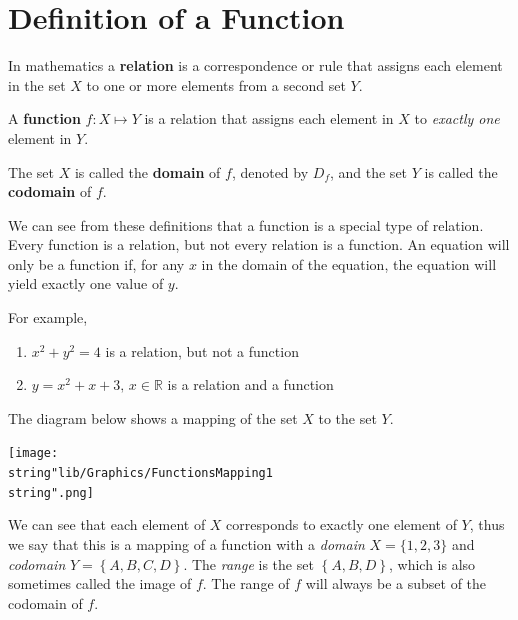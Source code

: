 \documentclass[11pt,a4paper]{book}
\newcommand{\R}{\mathbb{R}}
\begin{document}
\section{Definition of a Function}
\begin{tcolorbox}[colback=blue!5, colframe=black,boxrule=.4pt, sharpish corners]

In mathematics a \textbf{relation }is a correspondence or rule that assigns each element in the set $X$ to one or more elements from a second set $Y$.

\medskip{}

A \textbf{function} $f:X\mapsto Y$ is a relation that assigns
each element in $X$ to\textit{ exactly one} element in $Y$.

\medskip{}

The set $X$ is called the \textbf{domain} of $f$, denoted by $D_{f}$, and
the set $Y$ is called the \textbf{codomain} of $f$.

\end{tcolorbox}

We can see from these definitions that a function is a special type of relation. Every function is a relation, but not every relation is a function. An equation will only be a function if, for any $x$ in the domain of the equation, the equation will yield exactly one value of $y$.

For example,

\begin{enumerate}[label=(\alph*)]

\item $x^{2}+y^{2}=4$ is a relation, but not a function

\item $y=x^{2}+x+3,\,x\in\R$ is a relation and a function

\end{enumerate}

The diagram below shows a mapping of the set $X$ to the set $Y$.
\begin{center}
\texttt{[image: \\string"lib/Graphics/FunctionsMapping1\\string".png]}
\par\end{center}

We can see that each element of $X$ corresponds to exactly one element of $Y$, thus we say that this is a mapping of a function with a \textit{domain} $X=\{1,2,3\}$ and \textit{codomain} $Y=\left\{ A,B,C,D\right\} $. The \textit{range} is the set $\left\{ A,B,D\right\} $, which is also sometimes called the image of $f$. The range of $f$ will always be a subset of the codomain of $f$.
\end{document}
